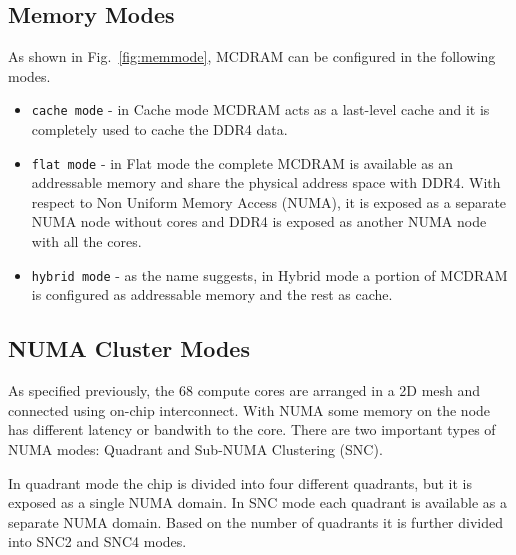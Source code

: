 \subsection{Memory Modes}
\label{src:knl/config}
As shown in Fig.~\ref{fig:memmode}, MCDRAM can be configured in the
following modes.
\begin{itemize}
    \item \texttt{cache mode} - in Cache mode
    MCDRAM acts as a last-level cache and it is completely used to
    cache the DDR4 data. %
    \item \texttt{flat mode} - in Flat mode the complete
    MCDRAM is available as an addressable memory and share the
    physical address space with DDR4. With respect to Non Uniform
    Memory Access (NUMA), it is exposed as a separate NUMA node
    without cores and DDR4 is exposed as another NUMA node with
    all the cores.
    \item \texttt{hybrid mode} - as the name suggests, in
    Hybrid mode a portion of MCDRAM is configured as addressable
    memory and the rest as cache.
\end{itemize}

\subsection{NUMA Cluster Modes}
\label{src:knl/cluster}
As specified previously, the 68 compute cores are arranged in a 2D
mesh and connected using on-chip interconnect. With NUMA some memory
on the node has different latency or bandwith to the core. %
There are two important types of NUMA modes: Quadrant and
Sub-NUMA Clustering (SNC).

In quadrant mode the chip is divided into four different quadrants, but
it is exposed as a single NUMA domain. In SNC mode each quadrant is
available as a separate NUMA domain. Based on the number of quadrants
it is further divided into SNC2 and SNC4 modes.
